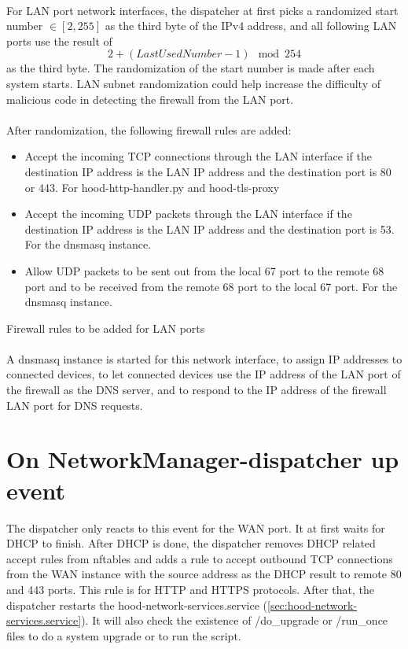 \documentclass[mscthesis]{usiinfthesis}
\begin{document}
\paragraph{}
For LAN port network interfaces, the dispatcher at first picks a randomized start number \(\in [2, 255]\) as the third byte of the IPv4 address, and all following LAN ports use the result of \[2 + (Last Used Number - 1) \mod 254\] as the third byte. The randomization of the start number is made after each system starts. LAN subnet randomization could help increase the difficulty of malicious code in detecting the firewall from the LAN port.
\paragraph{}
After randomization, the following firewall rules are added:
\begin{table}[H]
  \begin{itemize}
    \item Accept the incoming TCP connections through the LAN interface if the destination IP address is the LAN IP address and the destination port is 80 or 443. For hood-http-handler.py and hood-tls-proxy
    \item Accept the incoming UDP packets through the LAN interface if the destination IP address is the LAN IP address and the destination port is 53. For the dnsmasq instance.
    \item Allow UDP packets to be sent out from the local 67 port to the remote 68 port and to be received from the remote 68 port to the local 67 port. For the dnsmasq instance.
  \end{itemize}
  \caption{Firewall rules to be added for LAN ports}
  \label{lst:LAN-rules}
\end{table}
\paragraph{}
A dnsmasq instance is started for this network interface, to assign IP addresses to connected devices, to let connected devices use the IP address of the LAN port of the firewall as the DNS server, and to respond to the IP address of the firewall LAN port for DNS requests.

\section{On NetworkManager-dispatcher up event}
The dispatcher only reacts to this event for the WAN port. It at first waits for DHCP to finish. After DHCP is done, the dispatcher removes DHCP related accept rules from nftables and adds a rule to accept outbound TCP connections from the WAN instance with the source address as the DHCP result to remote 80 and 443 ports. This rule is for HTTP and HTTPS protocols. After that, the dispatcher restarts the hood-network-services.service (\cref{sec:hood-network-services.service}). It will also check the existence of /do\_upgrade or /run\_once files to do a system upgrade or to run the script.
\end{document}
